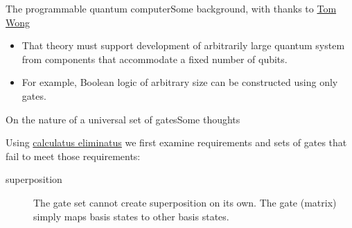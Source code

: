 \begin{frame}{The programmable quantum computer}{Some background, with thanks to \href{http://www.thomaswong.net/}{Tom Wong} }
{\begin{itemize}
    \item<11-> That theory must support development of arbitrarily large quantum system from components that accommodate a fixed number of qubits.
    \item<12-> For example, Boolean logic of arbitrary size can be constructed using only  gates.
\end{itemize}}
\end{frame}

\begin{frame}{On the nature of a universal set of gates}{Some thoughts }

Using \href{https://www.youtube.com/watch?v=LVIaZSYLwtE}{calculatus eliminatus} we first examine requirements and sets of gates that fail to meet those requirements:
\begin{description}
\item[superposition]  The gate set  cannot create superposition on its own.  The gate (matrix) simply maps basis states to other basis states. \CNOTMatrix

\end{description}

\end{frame}

